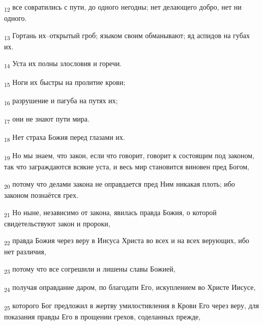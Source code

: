 \begin{tcolorbox}
\textsubscript{12} все совратились с пути, до одного негодны; нет делающего добро, нет ни одного.
\end{tcolorbox}
\begin{tcolorbox}
\textsubscript{13} Гортань их--открытый гроб; языком своим обманывают; яд аспидов на губах их.
\end{tcolorbox}
\begin{tcolorbox}
\textsubscript{14} Уста их полны злословия и горечи.
\end{tcolorbox}
\begin{tcolorbox}
\textsubscript{15} Ноги их быстры на пролитие крови;
\end{tcolorbox}
\begin{tcolorbox}
\textsubscript{16} разрушение и пагуба на путях их;
\end{tcolorbox}
\begin{tcolorbox}
\textsubscript{17} они не знают пути мира.
\end{tcolorbox}
\begin{tcolorbox}
\textsubscript{18} Нет страха Божия перед глазами их.
\end{tcolorbox}
\begin{tcolorbox}
\textsubscript{19} Но мы знаем, что закон, если что говорит, говорит к состоящим под законом, так что заграждаются всякие уста, и весь мир становится виновен пред Богом,
\end{tcolorbox}
\begin{tcolorbox}
\textsubscript{20} потому что делами закона не оправдается пред Ним никакая плоть; ибо законом познаётся грех.
\end{tcolorbox}
\begin{tcolorbox}
\textsubscript{21} Но ныне, независимо от закона, явилась правда Божия, о которой свидетельствуют закон и пророки,
\end{tcolorbox}
\begin{tcolorbox}
\textsubscript{22} правда Божия через веру в Иисуса Христа во всех и на всех верующих, ибо нет различия,
\end{tcolorbox}
\begin{tcolorbox}
\textsubscript{23} потому что все согрешили и лишены славы Божией,
\end{tcolorbox}
\begin{tcolorbox}
\textsubscript{24} получая оправдание даром, по благодати Его, искуплением во Христе Иисусе,
\end{tcolorbox}
\begin{tcolorbox}
\textsubscript{25} которого Бог предложил в жертву умилостивления в Крови Его через веру, для показания правды Его в прощении грехов, соделанных прежде,
\end{tcolorbox}
